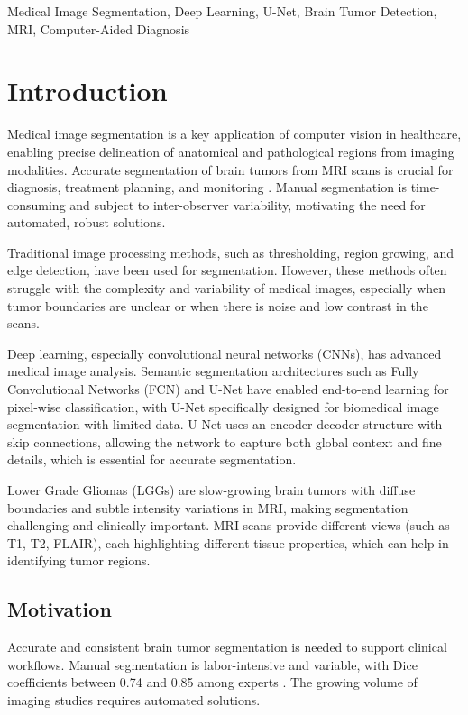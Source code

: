\documentclass[a4paper, journal]{IEEEtran}
\begin{document}
\begin{IEEEkeywords}
    Medical Image Segmentation, Deep Learning, U-Net, Brain Tumor Detection, MRI, Computer-Aided Diagnosis
\end{IEEEkeywords}

\section{Introduction}
\label{sec:intro}

Medical image segmentation is a key application of computer vision in healthcare, enabling precise delineation of anatomical and pathological regions from imaging modalities. Accurate segmentation of brain tumors from MRI scans is crucial for diagnosis, treatment planning, and monitoring \cite{menze2014multimodal}. Manual segmentation is time-consuming and subject to inter-observer variability, motivating the need for automated, robust solutions.

Traditional image processing methods, such as thresholding, region growing, and edge detection, have been used for segmentation. However, these methods often struggle with the complexity and variability of medical images, especially when tumor boundaries are unclear or when there is noise and low contrast in the scans.

Deep learning, especially convolutional neural networks (CNNs), has advanced medical image analysis. Semantic segmentation architectures such as Fully Convolutional Networks (FCN) \cite{long2015fully} and U-Net \cite{ronneberger2015u} have enabled end-to-end learning for pixel-wise classification, with U-Net specifically designed for biomedical image segmentation with limited data. U-Net uses an encoder-decoder structure with skip connections, allowing the network to capture both global context and fine details, which is essential for accurate segmentation.

Lower Grade Gliomas (LGGs) are slow-growing brain tumors with diffuse boundaries and subtle intensity variations in MRI, making segmentation challenging and clinically important. MRI scans provide different views (such as T1, T2, FLAIR), each highlighting different tissue properties, which can help in identifying tumor regions.

\subsection{Motivation}
Accurate and consistent brain tumor segmentation is needed to support clinical workflows. Manual segmentation is labor-intensive and variable, with Dice coefficients between 0.74 and 0.85 among experts \cite{menze2014multimodal}. The growing volume of imaging studies requires automated solutions.
\end{document}
